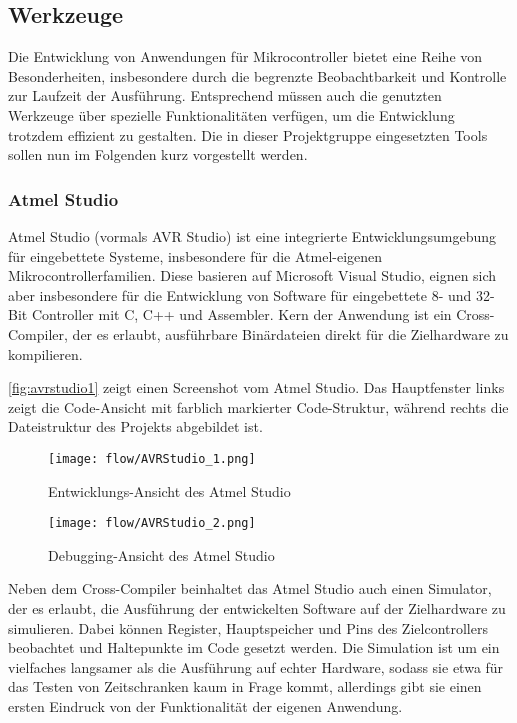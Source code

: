 \subsection{Werkzeuge}
Die Entwicklung von Anwendungen für Mikrocontroller bietet eine Reihe von Besonderheiten, insbesondere durch die begrenzte Beobachtbarkeit und Kontrolle zur Laufzeit der Ausführung. Entsprechend müssen auch die genutzten Werkzeuge über spezielle Funktionalitäten verfügen, um die Entwicklung trotzdem effizient zu gestalten. Die in dieser Projektgruppe eingesetzten Tools sollen nun im Folgenden kurz vorgestellt werden.

\subsubsection{Atmel Studio}
Atmel Studio (vormals AVR Studio) ist eine integrierte Entwicklungsumgebung für eingebettete Systeme, insbesondere für die Atmel-eigenen Mikrocontrollerfamilien.
Diese basieren auf Microsoft Visual Studio, eignen sich aber insbesondere für die Entwicklung von Software für eingebettete 8- und 32-Bit Controller mit C, C++ und Assembler.
Kern der Anwendung ist ein Cross-Compiler, der es erlaubt, ausführbare Binärdateien direkt für die Zielhardware zu kompilieren.

\autoref{fig:avrstudio1} zeigt einen Screenshot vom Atmel Studio. Das Hauptfenster links zeigt die Code-Ansicht mit farblich markierter Code-Struktur, während rechts die Dateistruktur des Projekts abgebildet ist.

\begin{figure}[!t]
  \centering
    \texttt{[image: flow/AVRStudio\_1.png]}
    \caption{Entwicklungs-Ansicht des Atmel Studio}
    \label{fig:avrstudio1}
\end{figure}

\begin{figure}[!h]
  \centering
    \texttt{[image: flow/AVRStudio\_2.png]}
    \caption{Debugging-Ansicht des Atmel Studio}
    \label{fig:avrstudio2}
\end{figure}

Neben dem Cross-Compiler beinhaltet das Atmel Studio auch einen Simulator, der es erlaubt, die Ausführung der entwickelten Software auf der Zielhardware zu simulieren. Dabei können Register, Hauptspeicher und Pins des Zielcontrollers beobachtet und Haltepunkte im Code gesetzt werden. Die Simulation ist um ein vielfaches langsamer als die Ausführung auf echter Hardware, sodass sie etwa für das Testen von Zeitschranken kaum in Frage kommt, allerdings gibt sie einen ersten Eindruck von der Funktionalität der eigenen Anwendung.

